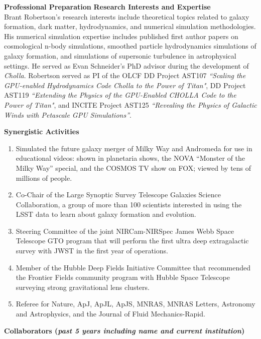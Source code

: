 \documentclass[11pt,letterpaper,english]{article}
\begin{document}
\begin{flushleft} {\bf Professional Preparation}
\vspace{-6pt}
{\bf Research Interests and Expertise}
{\parindent 16pt ~\\
Brant Robertson's research interests include theoretical topics related to galaxy formation, dark matter, hydrodynamics, and numerical simulation methodologies. His numerical simulation expertise includes published first author papers on cosmological n-body simulations, smoothed particle hydrodynamics simulations of galaxy formation, and simulations of supersonic turbulence in astrophysical settings. He served as Evan Schneider's PhD advisor during the development of {\it Cholla}. Robertson served as PI of the OLCF DD Project AST107 \textit{``Scaling the GPU-enabled Hydrodynamics Code Cholla to the Power of Titan"}, DD Project AST119 \textit{``Extending the Physics of the GPU-Enabled CHOLLA Code to the Power of Titan"}, and INCITE Project AST125 \textit{``Revealing the Physics of Galactic Winds with Petascale GPU Simulations''}.
}

\vspace{.04in}
{\bf Synergistic Activities}
\vspace{-6pt}
\begin{enumerate} \itemsep1pt \parskip0pt 
\item Simulated the future galaxy merger of Milky Way and Andromeda for use in educational videos: shown
in planetaria shows, the NOVA ``Monster of the Milky Way'' special, and the COSMOS TV show on FOX;
viewed by tens of millions of people.\\
\item Co-Chair of the Large Synoptic Survey Telescope Galaxies Science Collaboration, a group of more
than 100 scientists interested in using the LSST data to learn about galaxy formation and evolution.\\
\item Steering Committee of the joint NIRCam-NIRSpec James Webb Space Telescope GTO program that
will perform the first ultra deep extragalactic survey with JWST in the first year of operations.\\
\item Member of the Hubble Deep Fields Initiative Committee that recommended the Frontier Fields
community program with Hubble Space Telescope surveying strong gravitational lens clusters.\\
\item Referee for Nature, ApJ, ApJL, ApJS, MNRAS, MNRAS Letters, Astronomy and Astrophysics, and the
Journal of Fluid Mechanics-Rapid.\\
\end{enumerate} 

\vspace{-6pt}
{\bf Collaborators ({\emph{past 5 years including name and current institution}})} 
{\parindent 16pt
}


\end{flushleft}
\end{document}
